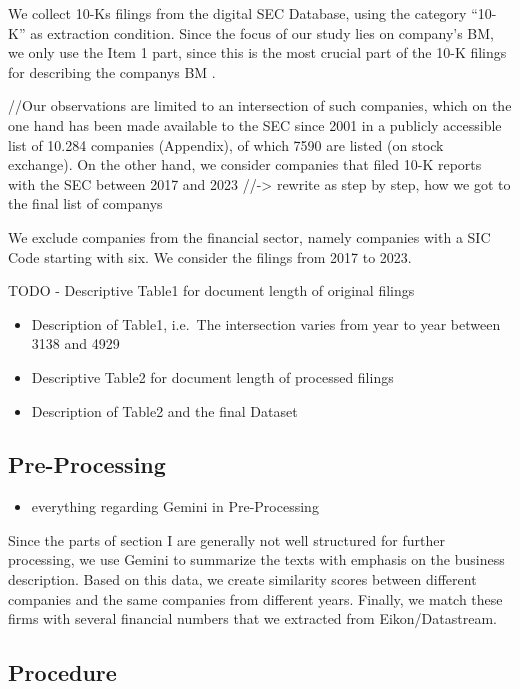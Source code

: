 \documentclass[manuscript,screen,review]{acmart}
\providecommand{\tightlist}{%
  \setlength{\itemsep}{0pt}\setlength{\parskip}{0pt}}\usepackage{longtable,booktabs,array}
\begin{document}
We collect 10-Ks filings from the digital SEC Database, using the
category ``10-K'' as extraction condition. Since the focus of our study
lies on company's BM, we only use the Item 1 part, since this is the
most crucial part of the 10-K filings for describing the companys BM
\citep{lee_business_2014}.

//Our observations are limited to an intersection of such companies,
which on the one hand has been made available to the SEC since 2001 in a
publicly accessible list of 10.284 companies (Appendix), of which 7590
are listed (on stock exchange). On the other hand, we consider companies
that filed 10-K reports with the SEC between 2017 and 2023
//-\textgreater{} rewrite as step by step, how we got to the final list
of companys

We exclude companies from the financial sector, namely companies with a
SIC Code starting with six. We consider the filings from 2017 to 2023.

TODO - Descriptive Table1 for document length of original filings

\begin{itemize}
\item
  Description of Table1, i.e.~The intersection varies from year to year
  between 3138 and 4929
\item
  Descriptive Table2 for document length of processed filings
\item
  Description of Table2 and the final Dataset
\end{itemize}

\subsection{Pre-Processing}\label{pre-processing}

\begin{itemize}
\tightlist
\item
  everything regarding Gemini in Pre-Processing
\end{itemize}

Since the parts of section I are generally not well structured for
further processing, we use Gemini to summarize the texts with emphasis
on the business description. Based on this data, we create similarity
scores between different companies and the same companies from different
years. Finally, we match these firms with several financial numbers that
we extracted from Eikon/Datastream.

\subsection{Procedure}\label{procedure}
\end{document}

